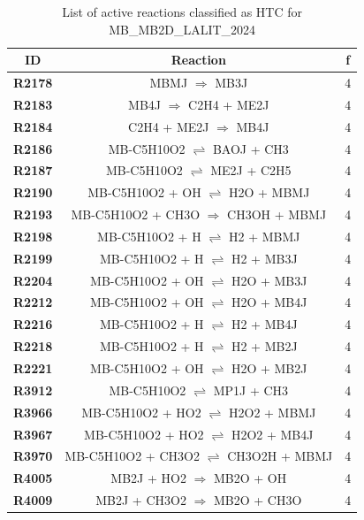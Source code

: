 \begin{table}[!ht]
\centering
\caption{List of active reactions classified as HTC for MB_MB2D_LALIT_2024}
\label{table:MB_MB2D_LALIT_2024_HTC}
\begin{tabular}{ccc}
\hline
\textbf{ID} & \textbf{Reaction} & \textbf{f} \\
\hline
\textbf{R2178} & MBMJ $\Rightarrow$ MB3J & 4 \\
\textbf{R2183} & MB4J $\Rightarrow$ C2H4 + ME2J & 4 \\
\textbf{R2184} & C2H4 + ME2J $\Rightarrow$ MB4J & 4 \\
\textbf{R2186} & MB-C5H10O2 $\rightleftharpoons$ BAOJ + CH3 & 4 \\
\textbf{R2187} & MB-C5H10O2 $\rightleftharpoons$ ME2J + C2H5 & 4 \\
\textbf{R2190} & MB-C5H10O2 + OH $\rightleftharpoons$ H2O + MBMJ & 4 \\
\textbf{R2193} & MB-C5H10O2 + CH3O $\Rightarrow$ CH3OH + MBMJ & 4 \\
\textbf{R2198} & MB-C5H10O2 + H $\rightleftharpoons$ H2 + MBMJ & 4 \\
\textbf{R2199} & MB-C5H10O2 + H $\rightleftharpoons$ H2 + MB3J & 4 \\
\textbf{R2204} & MB-C5H10O2 + OH $\rightleftharpoons$ H2O + MB3J & 4 \\
\textbf{R2212} & MB-C5H10O2 + OH $\rightleftharpoons$ H2O + MB4J & 4 \\
\textbf{R2216} & MB-C5H10O2 + H $\rightleftharpoons$ H2 + MB4J & 4 \\
\textbf{R2218} & MB-C5H10O2 + H $\rightleftharpoons$ H2 + MB2J & 4 \\
\textbf{R2221} & MB-C5H10O2 + OH $\rightleftharpoons$ H2O + MB2J & 4 \\
\textbf{R3912} & MB-C5H10O2 $\rightleftharpoons$ MP1J + CH3 & 4 \\
\textbf{R3966} & MB-C5H10O2 + HO2 $\rightleftharpoons$ H2O2 + MBMJ & 4 \\
\textbf{R3967} & MB-C5H10O2 + HO2 $\rightleftharpoons$ H2O2 + MB4J & 4 \\
\textbf{R3970} & MB-C5H10O2 + CH3O2 $\rightleftharpoons$ CH3O2H + MBMJ & 4 \\
\textbf{R4005} & MB2J + HO2 $\Rightarrow$ MB2O + OH & 4 \\
\textbf{R4009} & MB2J + CH3O2 $\Rightarrow$ MB2O + CH3O & 4 \\
\hline
\end{tabular}
\end{table}
